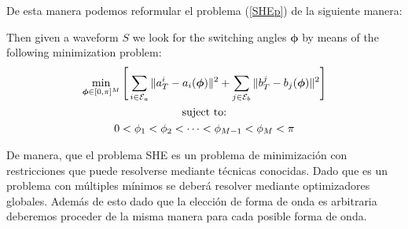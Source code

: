 De esta manera podemos reformular el problema (\ref{SHEp}) de la siguiente manera:
\begin{problem}
    Then given a waveform $ S $ we look for the switching angles $\bm{\phi}$ by means of the following minimization problem:
        \begin{gather} 
        \min_{\bm{\phi} \in [0,\pi]^{M} }  \Bigg[
        \sum_{i \in \mathcal{E}_a} \| a_T^i - a_i(\bm{\phi}) \|^2 +
        \sum_{j \in \mathcal{E}_b} \| b_T^j - b_j(\bm{\phi}) \|^2 \Bigg]
        \\
        \notag \text{suject to:}
        \\
        0 <\phi_1 < \phi_2 < \dots < \phi_{M-1} < \phi_{M} < \pi  
    \end{gather}
\end{problem}

De manera, que el problema SHE es un problema de minimización con restricciones que puede resolverse mediante técnicas conocidas. Dado que es un problema con múltiples mínimos se deberá resolver mediante optimizadores globales. Además de esto dado que la elección de forma de onda es arbitraria deberemos proceder de la misma manera para cada posible forma de onda. 

